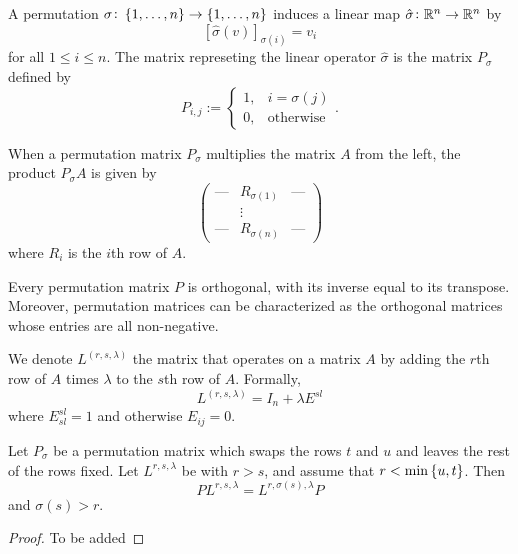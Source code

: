 \documentclass[11pt,a4paper]{article}
\begin{document}
\begin{definition}
  A permutation $\sigma \colon \left\{1,\dots,n\right\} \to \left\{1,\dots,n\right\}$
  induces a linear map $\hat \sigma \colon \mathbb{R}^n \to \mathbb{R}^n$ by
  \[
    \left[\hat \sigma(v) \right]_{\sigma(i)} = v_i
  \]
  for all $1 \le i \le n$.
  The matrix represeting the linear operator $\hat \sigma$ is the matrix
  $P_{\sigma}$ defined by
  \[
    P_{i,j} :=
    \begin{cases}
      1, &i = \sigma(j) \\
      0, &\text{otherwise}
    \end{cases}.
  \]
\end{definition}
\begin{remark}
  When a permutation matrix $P_{\sigma}$ multiplies the matrix $A$ from
  the left, the product $P_{\sigma} A$ is given by
  \[
    \begin{pmatrix}
      \text{---} & R_{\sigma(1)} & \text{---} \\ 
        & \vdots &  \\
      \text{---} & R_{\sigma(n)} & \text{---}
    \end{pmatrix}
  \]
  where $R_i$ is the $i$th row of $A$.
\end{remark}
\begin{remark}
  Every permutation matrix $P$ is orthogonal,
  with its inverse equal to its transpose.
  Moreover, permutation matrices can be characterized as the orthogonal
  matrices whose entries are all non-negative.
\end{remark}

\begin{remark}
  We denote $L^{(r,s,\lambda)}$ the matrix that operates on a matrix $A$
  by adding the $r$th row of $A$ times $\lambda$ to the $s$th row of $A$.
  Formally,
  \[
    L^{(r,s,\lambda)} = I_n + \lambda E^{sl}
  \]
  where $E^{sl}_{sl} = 1$ and otherwise $E_{ij} = 0$.
\end{remark}

\begin{lemma}
  \label{lem:gaussians-commute}
  Let $P_{\sigma}$ be a permutation matrix which swaps the rows $t$ and $u$
  and leaves the rest of the rows fixed.
  Let $L^{r,s,\lambda}$ be with $r > s$,
  and assume that $r < \min\left\{u,t\right\}$.
  Then
  \[
    P L^{r,s,\lambda} = L^{r,\sigma(s),\lambda} P
  \]
  and $\sigma(s) > r$.
\end{lemma}
\begin{proof}
  To be added
\end{proof}
\end{document}
